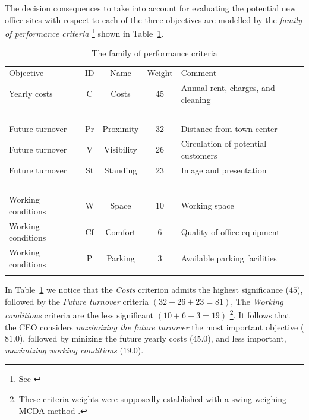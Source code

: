 The decision consequences to take into account for evaluating the potential new office sites with respect to each of the three objectives are modelled by the \emph{family of performance criteria} \footnote{See \citealp{ROY-2000}} shown in Table~\ref{tab:4.2}.
\begin{table}[h]
\caption{The family of performance criteria}
\label{tab:4.2}       %
\begin{center}
    \begin{tabular}{l|c|c|c|l}
      \svhline\noalign{\smallskip}
      Objective & ID & Name & Weight & Comment\\
      \noalign{\smallskip}\hline\noalign{\smallskip}
    Yearly costs  &       C &   Costs &  45 &     Annual rent, charges, and cleaning\\
    \             &  \      & \        &  \ & \ \\
    Future turnover   &   Pr  & Proximity  & 32 & Distance from town center\\
    Future turnover   &   V  &  Visibility & 26 & Circulation of potential customers \\
    Future turnover   &   St &   Standing & 23 &   Image and presentation\\
    \                 &   \   & \          &  \ & \  \\
    Working conditions &  W  &  Space   &   10 &  Working space\\
    Working conditions &  Cf &  Comfort  &  6 &  Quality of office equipment\\
    Working conditions &  P  &  Parking  &  3 &  Available parking facilities\\
      \noalign{\smallskip}\hline
    \end{tabular}   
  \end{center}
\end{table}

In Table~\ref{tab:4.2} we notice that the \emph{Costs} criterion admits the highest significance ($45$), followed by the \emph{Future turnover} criteria $(32 + 26 + 23 = 81)$, The \emph{Working conditions} criteria are the less significant $(10 + 6 + 3 = 19)$ \footnote{These criteria weights were supposedly established with a swing weighing MCDA method \citep{EIS-2001}.}. It follows that the CEO considers \emph{maximizing the future turnover} the most important objective ($81.0$), followed by minizing the future yearly costs ($45.0$), and less important, \emph{maximizing working conditions} ($19.0$). 

